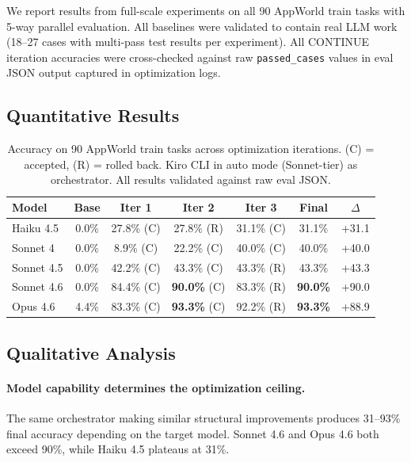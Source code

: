 \documentclass[11pt,a4paper]{article}
\begin{document}
We report results from full-scale experiments on all 90 AppWorld train tasks with 5-way parallel evaluation. All baselines were validated to contain real LLM work (18--27 cases with multi-pass test results per experiment). All CONTINUE iteration accuracies were cross-checked against raw \texttt{passed\_cases} values in eval JSON output captured in optimization logs.

\subsection{Quantitative Results}

\begin{table}[h]
\centering
\begin{tabular}{lcccccc}
\toprule
\textbf{Model} & \textbf{Base} & \textbf{Iter 1} & \textbf{Iter 2} & \textbf{Iter 3} & \textbf{Final} & \textbf{$\Delta$} \\
\midrule
Haiku 4.5 & 0.0\% & 27.8\% (C) & 27.8\% (R) & 31.1\% (C) & 31.1\% & +31.1 \\
Sonnet 4 & 0.0\% & 8.9\% (C) & 22.2\% (C) & 40.0\% (C) & 40.0\% & +40.0 \\
Sonnet 4.5 & 0.0\% & 42.2\% (C) & 43.3\% (C) & 43.3\% (R) & 43.3\% & +43.3 \\
Sonnet 4.6 & 0.0\% & 84.4\% (C) & \textbf{90.0\%} (C) & 83.3\% (R) & \textbf{90.0\%} & +90.0 \\
Opus 4.6 & 4.4\% & 83.3\% (C) & \textbf{93.3\%} (C) & 92.2\% (R) & \textbf{93.3\%} & +88.9 \\
\bottomrule
\end{tabular}
\caption{Accuracy on 90 AppWorld train tasks across optimization iterations. (C) = accepted, (R) = rolled back. Kiro CLI in auto mode (Sonnet-tier) as orchestrator. All results validated against raw eval JSON.}
\label{tab:results}
\end{table}

\subsection{Qualitative Analysis}

\paragraph{Model capability determines the optimization ceiling.} The same orchestrator making similar structural improvements produces 31--93\% final accuracy depending on the target model. Sonnet 4.6 and Opus 4.6 both exceed 90\%, while Haiku 4.5 plateaus at 31\%.
\end{document}
